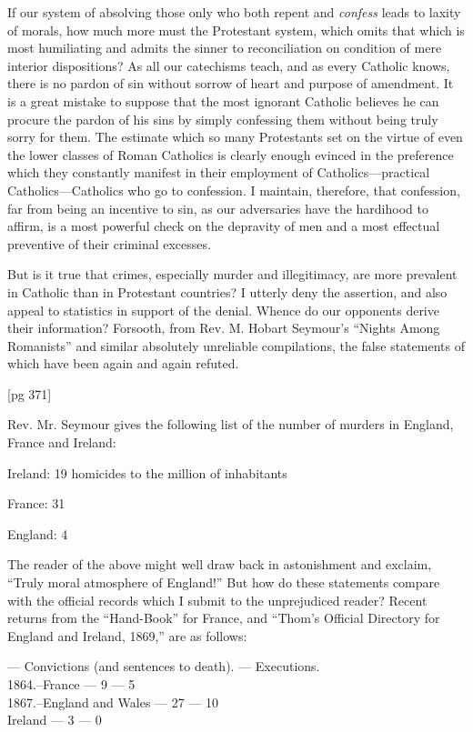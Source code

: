 If our system of absolving those only who both
repent and \emph{confess} leads to laxity of morals, how
much more must the Protestant system, which
omits that which is most humiliating and admits
the sinner to reconciliation on condition of mere
interior dispositions? As all our catechisms teach,
and as every Catholic knows, there is no pardon
of sin without sorrow of heart and purpose of
amendment. It is a great mistake to suppose that
the most ignorant Catholic believes he can procure
the pardon of his sins by simply confessing them
without being truly sorry for them. The estimate
which so many Protestants set on the virtue of
even the lower classes of Roman Catholics is
clearly enough evinced in the preference which
they constantly manifest in their employment of
Catholics—practical Catholics—Catholics who go
to confession. I maintain, therefore, that confession,
far from being an incentive to sin, as our adversaries
have the hardihood to affirm, is a most
powerful check on the depravity of men and a
most effectual preventive of their criminal excesses.

But is it true that crimes, especially murder and
illegitimacy, are more prevalent in Catholic than
in Protestant countries? I utterly deny the assertion,
and also appeal to statistics in support of the
denial. Whence do our opponents derive their information?
Forsooth, from Rev. M. Hobart Seymour's
“Nights Among Romanists” and similar
absolutely unreliable compilations, the false statements
of which have been again and again refuted.

[pg 371]

Rev. Mr. Seymour gives the following list of the
number of murders in England, France and Ireland:

Ireland: 19 homicides to the million of inhabitants

France: 31

England: 4

The reader of the above might well draw back in
astonishment and exclaim, “Truly moral atmosphere
of England!” But how do these statements
compare with the official records which I submit to
the unprejudiced reader? Recent returns from
the “Hand-Book” for France, and “Thom's Official
Directory for England and Ireland, 1869,” are
as follows:

— Convictions (and sentences to death). — Executions. \\
1864.--France — 9 — 5 \\
1867.--England and Wales — 27 — 10 \\
Ireland — 3 — 0


